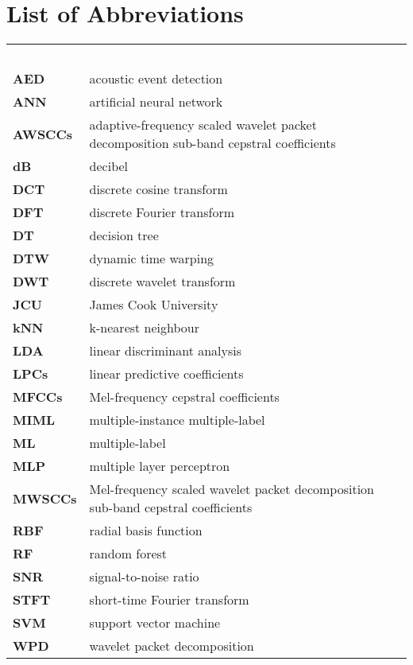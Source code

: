 

\chapter*{List of Abbreviations}


\renewcommand{\arraystretch}{1.4} 
\begin{longtable}{llr}
\multicolumn{3}{l}{\textbf{}\hspace{0.4\textwidth}~~}\\
\textbf{AED}	   &                 acoustic event detection \\
\textbf{ANN}     &  artificial neural network  \\
\textbf{AWSCCs} & adaptive-frequency scaled wavelet packet decomposition sub-band cepstral coefficients \\
\textbf{dB}    &                      decibel \\
\textbf{DCT}    &                    discrete cosine transform \\
\textbf{DFT}   &                    discrete Fourier transform \\
\textbf{DT}     &                  decision tree                       \\
\textbf{DTW}   &        dynamic time warping               \\
\textbf{DWT}   & discrete wavelet transform \\
\textbf{JCU} & James Cook University \\
\textbf{kNN}	  &                  k-nearest neighbour \\
\textbf{LDA}      &                  linear discriminant analysis \\
\textbf{LPCs}	 &                   linear predictive coefficients \\
\textbf{MFCCs} &	       Mel-frequency cepstral coefficients \\
\textbf{MIML}   &                 multiple-instance multiple-label  \\ 
\textbf{ML}    &                      multiple-label \\
\textbf{MLP}    &                   multiple layer perceptron \\
\textbf{MWSCCs} & Mel-frequency scaled wavelet packet decomposition sub-band cepstral coefficients \\
\textbf{RBF}    &                   radial basis function \\
\textbf{RF}     &                      random forest \\
\textbf{SNR}   &     signal-to-noise ratio\\
\textbf{STFT} & short-time Fourier transform \\
\textbf{SVM}	     &               support vector machine \\
\textbf{WPD}     &                 wavelet packet decomposition \\
\end{longtable}

